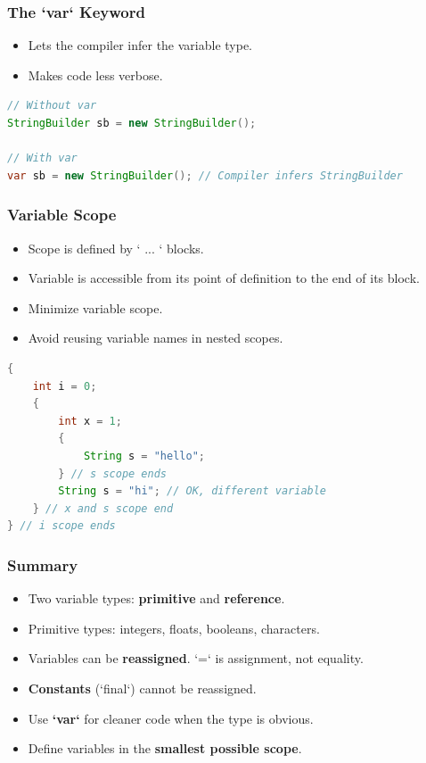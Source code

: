 \documentclass[serif, aspectratio=169]{beamer}
\begin{document}
\begin{frame}[fragile]
\frametitle{The `var` Keyword}
\begin{itemize}
    \item Lets the compiler infer the variable type.
    \item Makes code less verbose.
\end{itemize}
\begin{lstlisting}[language=Java]
// Without var
StringBuilder sb = new StringBuilder();

// With var
var sb = new StringBuilder(); // Compiler infers StringBuilder
\end{lstlisting}
\end{frame}

\begin{frame}[fragile]
\frametitle{Variable Scope}
\begin{itemize}
    \item Scope is defined by `{ ... }` blocks.
    \item Variable is accessible from its point of definition to the end of its block.
    \item Minimize variable scope.
    \item Avoid reusing variable names in nested scopes.
\end{itemize}
\begin{lstlisting}[language=Java]
{
    int i = 0;
    {
        int x = 1;
        {
            String s = "hello";
        } // s scope ends
        String s = "hi"; // OK, different variable
    } // x and s scope end
} // i scope ends
\end{lstlisting}
\end{frame}

\begin{frame}[fragile]
\frametitle{Summary}
\begin{itemize}
    \item Two variable types: \textbf{primitive} and \textbf{reference}.
    \item Primitive types: integers, floats, booleans, characters.
    \item Variables can be \textbf{reassigned}. `=` is assignment, not equality.
    \item \textbf{Constants} (`final`) cannot be reassigned.
    \item Use \textbf{`var`} for cleaner code when the type is obvious.
    \item Define variables in the \textbf{smallest possible scope}.
\end{itemize}
\end{frame}
\end{document}
